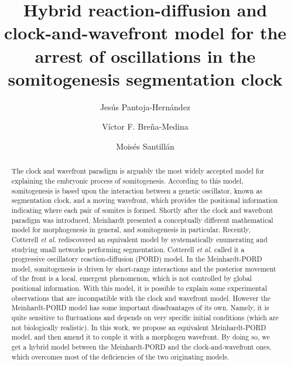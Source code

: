 \documentclass[%
 preprint,
 aip, 
 amsmath,amssymb,
]{revtex4-2}
\begin{document}
\title{Hybrid reaction-diffusion and clock-and-wavefront model for the arrest of oscillations in the somitogenesis segmentation clock}

\author{Jes\'us Pantoja-Hern\'andez}

\author{V\'ictor F. Bre\~na-Medina}

\author{Mois\'es Santill\'an}

\begin{abstract}
The clock and wavefront paradigm is arguably the most widely accepted model for explaining the embryonic process of somitogenesis. According to this model, somitogenesis is based upon the interaction between a genetic oscillator, known as segmentation clock, and a moving wavefront, which provides the positional information indicating where each pair of somites is formed. Shortly after the clock and wavefront paradigm was introduced, Meinhardt presented a conceptually different mathematical model for morphogenesis in general, and somitogenesis in particular. Recently, Cotterell \emph{et al.} rediscovered an equivalent model by systematically enumerating and studying small networks performing segmentation. Cotterell \emph{et al.} called it a progressive oscillatory reaction-diffusion (PORD) model. In the Meinhardt-PORD model, somitogenesis is driven by short-range interactions and the posterior movement of the front is a local, emergent phenomenon, which is not controlled by global positional information. With this model, it is possible to explain some experimental observations that are incompatible with the clock and wavefront model. However the Meinhardt-PORD model has some important disadvantages of its own. Namely, it is quite sensitive to fluctuations and depends on very specific initial conditions (which are not biologically realistic). In this work, we propose an equivalent Meinhardt-PORD model, and then amend it to couple it with a morphogen wavefront. By doing so, we get a hybrid model between the Meinhardt-PORD and the clock-and-wavefront ones, which overcomes most of the deficiencies of the two originating models.
\end{abstract}
	
\end{document}
